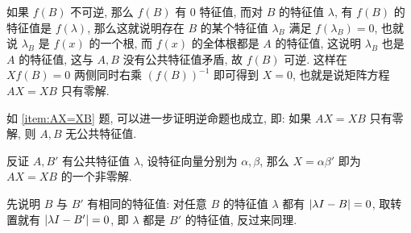 \begin{exercise}[series=exer]
\begin{answer}
      如果 $ f(B) $ 不可逆, 那么 $ f(B) $ 有 $ 0 $ 特征值, 而对 $ B $ 的特征值 $ \lambda $, 有 $ f(B) $ 的特征值是 $ f(\lambda) $, 那么这就说明存在 $ B $ 的某个特征值 $ \lambda_{B} $ 满足 $ f(\lambda_{B}) = 0 $, 也就说 $ \lambda_{B} $ 是 $ f(x) $ 的一个根, 而 $ f(x) $ 的全体根都是 $ A $ 的特征值, 这说明 $ \lambda_{B} $ 也是 $ A $ 的特征值, 这与 $ A, B $ 没有公共特征值矛盾, 故 $ f(B) $ 可逆. 这样在 $ Xf(B) = 0 $ 两侧同时右乘 $ (f(B))^{-1} $ 即可得到 $ X = 0 $, 也就是说矩阵方程 $ AX = XB $ 只有零解.
  \end{answer}
  \item 如 \ref{item:AX=XB} 题, 可以进一步证明逆命题也成立, 即: 如果 $ AX = XB $ 只有零解, 则 $ A, B $ 无公共特征值.
  \begin{hint}
      反证 $ A, B' $ 有公共特征值 $ \lambda $, 设特征向量分别为 $ \alpha, \beta $, 那么 $ X = \alpha\beta' $ 即为 $ AX = XB $ 的一个非零解.
  \end{hint}
  \begin{answer}
      先说明 $ B $ 与 $ B' $ 有相同的特征值: 对任意 $ B $ 的特征值 $ \lambda $ 都有 $ \abs{\lambda I - B} = 0 $, 取转置就有 $ \abs{\lambda I - B'} = 0 $, 即 $ \lambda $ 都是 $ B' $ 的特征值, 反过来同理.


\end{answer}
\end{exercise}
